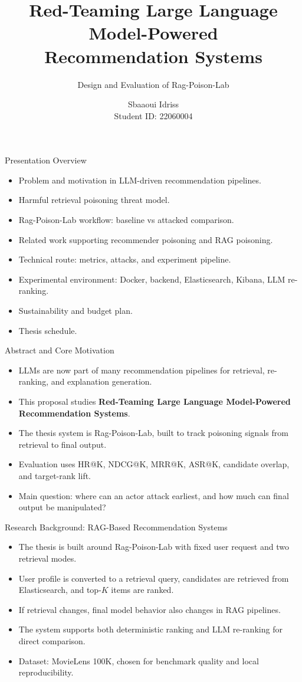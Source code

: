 \documentclass[aspectratio=169,11pt]{beamer}
\title[Red Team Testing]{Red-Teaming Large Language Model-Powered\\Recommendation Systems}
\subtitle{Design and Evaluation of Rag-Poison-Lab}
\author[Sbaaoui Idriss]{Sbaaoui Idriss\\Student ID: 22060004}
\institute[ECUST]{Computer Science, 华东理工大学\\Supervisor: 张恒润}
\date{}
\begin{document}
\begin{frame}[plain]
  \titlepage
\end{frame}

\begin{frame}{Presentation Overview}
\begin{itemize}
  \item Problem and motivation in LLM-driven recommendation pipelines.
  \item Harmful retrieval poisoning threat model.
  \item Rag-Poison-Lab workflow: baseline vs attacked comparison.
  \item Related work supporting recommender poisoning and RAG poisoning.
  \item Technical route: metrics, attacks, and experiment pipeline.
  \item Experimental environment: Docker, backend, Elasticsearch, Kibana, LLM re-ranking.
  \item Sustainability and budget plan.
  \item Thesis schedule.
\end{itemize}
\end{frame}

\begin{frame}{Abstract and Core Motivation}
\begin{itemize}
  \item LLMs are now part of many recommendation pipelines for retrieval, re-ranking, and explanation generation.
  \item This proposal studies \textbf{Red-Teaming Large Language Model-Powered Recommendation Systems}.
  \item The thesis system is Rag-Poison-Lab, built to track poisoning signals from retrieval to final output.
  \item Evaluation uses HR@K, NDCG@K, MRR@K, ASR@K, candidate overlap, and target-rank lift.
  \item Main question: where can an actor attack earliest, and how much can final output be manipulated?
\end{itemize}
\end{frame}

\begin{frame}{Research Background: RAG-Based Recommendation Systems}
\begin{itemize}
  \item The thesis is built around Rag-Poison-Lab with fixed user request and two retrieval modes.
  \item User profile is converted to a retrieval query, candidates are retrieved from Elasticsearch, and top-$K$ items are ranked.
  \item If retrieval changes, final model behavior also changes in RAG pipelines.
  \item The system supports both deterministic ranking and LLM re-ranking for direct comparison.
  \item Dataset: MovieLens 100K, chosen for benchmark quality and local reproducibility.
\end{itemize}
\end{frame}
\end{document}
